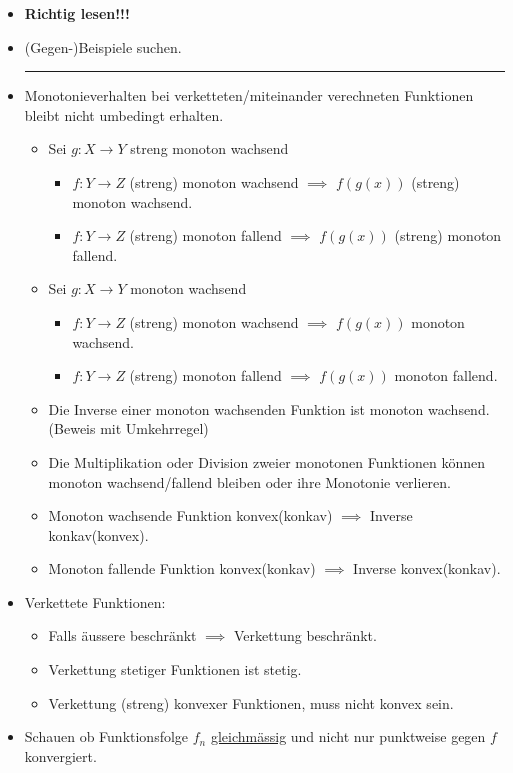 \documentclass[a4paper,fontsize = 7pt]{scrartcl}
\begin{document}
\begin{itemize}
	\item \textbf{Richtig lesen!!!}
	\item (Gegen-)Beispiele suchen.
	\hrule
	\item Monotonieverhalten bei verketteten/miteinander verechneten Funktionen bleibt nicht umbedingt erhalten.
    \begin{itemize}
      \item Sei $g: X \to Y$ streng monoton wachsend
      \begin{itemize}
        \item $f: Y \to Z$ (streng) monoton wachsend $\implies$ $f(g(x))$ (streng) monoton wachsend.
        \item $f: Y \to Z$ (streng) monoton fallend $\implies$ $f(g(x))$ (streng) monoton fallend.
      \end{itemize}
      \item Sei $g: X \to Y$ monoton wachsend
      \begin{itemize}
        \item $f: Y \to Z$ (streng) monoton wachsend $\implies$ $f(g(x))$ monoton wachsend.
        \item $f: Y \to Z$ (streng) monoton fallend $\implies$ $f(g(x))$ monoton fallend.
      \end{itemize}
      \item Die Inverse einer monoton wachsenden Funktion ist monoton wachsend.(Beweis mit Umkehrregel)
      \item Die Multiplikation oder Division zweier monotonen Funktionen können monoton wachsend/fallend bleiben oder ihre Monotonie verlieren.
      \item Monoton wachsende Funktion konvex(konkav) $\implies$ Inverse konkav(konvex).
      \item Monoton fallende Funktion konvex(konkav) $\implies$ Inverse konvex(konkav).
    \end{itemize}
	\item Verkettete Funktionen:
		\begin{itemize}
			\item Falls äussere beschränkt $\implies$ Verkettung beschränkt.
			\item Verkettung stetiger Funktionen ist stetig.
			\item Verkettung (streng) konvexer Funktionen, muss nicht konvex sein.
		\end{itemize}
	\item Schauen ob Funktionsfolge $f_n$ \underline{gleichmässig} und nicht nur punktweise gegen $f$ konvergiert.

\end{itemize}
\end{document}
